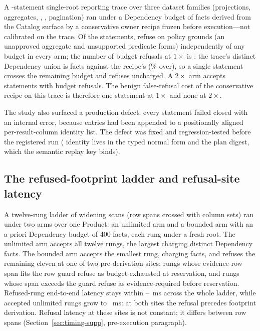 \documentclass[journal,onecolumn]{IEEEtran}
\newcommand{\code}[1]{\texttt{\detokenize{#1}}}
\begin{document}
A \FinalVFiveBenignStatements{}-statement single-root reporting trace over
three dataset families (projections, aggregates, \code{GROUP BY},
\code{HAVING}, pagination) ran under a Dependency budget of
\FinalVFiveBenignRecipeDependencyBudget{} facts derived from the Catalog
surface by a conservative owner recipe frozen before execution---not
calibrated on the trace. Of the \FinalVFiveBenignStatements{} statements,
\FinalVFiveBenignPolicyRefusals{} refuse on policy grounds (an unapproved
aggregate and unsupported predicate forms) independently of any budget in
every arm; the number of budget refusals at $1\times$ is
\FinalVFiveBenignRecipeBudgetRefusals{}: the trace's distinct Dependency
union is \FinalVFiveBenignUnionDependency{} facts against the recipe's
\FinalVFiveBenignRecipeDependencyBudget{}
(\FinalVFiveBenignUnionOverBudgetPercent\% over), so a single
statement crosses the remaining budget and refuses uncharged. A $2\times$ arm accepts \FinalVFiveBenignXTwoAccepted{}
statements with \FinalVFiveBenignXTwoBudgetRefusals{} budget refusals. The
benign false-refusal cost of the conservative recipe on this trace is
therefore one statement at $1\times$ and none at $2\times$.

The study also surfaced a production defect: every \code{HAVING} statement
failed closed with an internal error, because \code{HAVING} entries had
been appended to a positionally aligned per-result-column identity list.
The defect was fixed and regression-tested before the registered run
(\code{HAVING} identity lives in the typed normal form and the plan
digest, which the semantic replay key binds).

\subsection{The refused-footprint ladder and refusal-site latency}
\label{sec:footprint-supp}

A twelve-rung ladder of widening scans (row spans crossed with column sets)
ran under two arms over one Product: an unlimited arm and a bounded arm
with an a-priori Dependency budget of 400 facts, each rung under a fresh
root. The unlimited arm accepts all twelve rungs, the largest charging
\FinalVFiveFootprintMaxDependency{} distinct Dependency facts. The bounded
arm accepts the smallest rung, charging
\FinalVFiveFootprintBoundedAcceptedDependency{} facts, and refuses the
remaining eleven at one of two pre-derivation sites:
\FinalVFiveFootprintBoundedBudgetRefusals{} rungs whose evidence-row span
fits the row guard refuse as budget-exhausted at reservation, and
\FinalVFiveFootprintBoundedEvidenceRefusals{} rungs whose span exceeds the
guard refuse as evidence-required before reservation. Refused-rung
end-to-end latency stays within
\FinalVFiveFootprintRefusedMSMin{}--\FinalVFiveFootprintRefusedMSMax{}~ms
across the whole ladder, while accepted unlimited rungs grow to
\FinalVFiveFootprintAcceptedMSMax{}~ms: at both sites the refusal precedes
footprint derivation. Refusal latency at these sites is not constant; it
differs between row spans (Section~\ref{sec:timing-supp}, pre-execution
paragraph).
\end{document}
